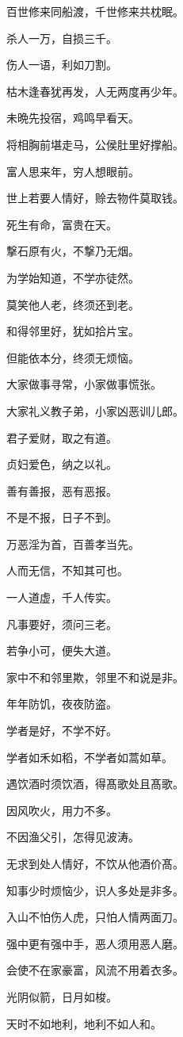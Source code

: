 \documentclass[12pt,oneside]{book}
\begin{document}
百世修来同船渡，千世修来共枕眠。

杀人一万，自损三千。

伤人一语，利如刀割。

枯木逢春犹再发，人无两度再少年。

未晩先投宿，鸡鸣早看天。

将相胸前堪走马，公侯肚里好撑船。

富人思来年，穷人想眼前。

世上若要人情好，赊去物件莫取钱。

死生有命，富贵在天。

撃石原有火，不撃乃无烟。

为学始知道，不学亦徒然。

莫笑他人老，终须还到老。

和得邻里好，犹如拾片宝。

但能依本分，终须无烦恼。

大家做事寻常，小家做事慌张。

大家礼义教子弟，小家凶恶训儿郎。

君子爱财，取之有道。

贞妇爱色，纳之以礼。

善有善报，恶有恶报。

不是不报，日子不到。

万恶淫为首，百善孝当先。

人而无信，不知其可也。

一人道虚，千人传实。

凡事要好，须问三老。

若争小可，便失大道。

家中不和邻里欺，邻里不和说是非。

年年防饥，夜夜防盗。

学者是好，不学不好。

学者如禾如稻，不学者如蒿如草。

遇饮酒时须饮酒，得髙歌处且髙歌。

因风吹火，用力不多。

不因渔父引，怎得见波涛。

无求到处人情好，不饮从他酒价髙。

知事少时烦恼少，识人多处是非多。

入山不怕伤人虎，只怕人情两面刀。

强中更有强中手，恶人须用恶人磨。

会使不在家豪富，风流不用着衣多。

光阴似箭，日月如梭。

天时不如地利，地利不如人和。
\end{document}
